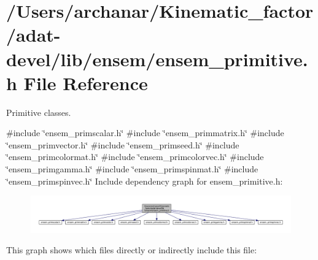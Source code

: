 \hypertarget{adat-devel_2lib_2ensem_2ensem__primitive_8h}{}\section{/\+Users/archanar/\+Kinematic\+\_\+factor/adat-\/devel/lib/ensem/ensem\+\_\+primitive.h File Reference}
\label{adat-devel_2lib_2ensem_2ensem__primitive_8h}


Primitive classes.  


{\ttfamily \#include \char`\"{}ensem\+\_\+primscalar.\+h\char`\"{}}\newline
{\ttfamily \#include \char`\"{}ensem\+\_\+primmatrix.\+h\char`\"{}}\newline
{\ttfamily \#include \char`\"{}ensem\+\_\+primvector.\+h\char`\"{}}\newline
{\ttfamily \#include \char`\"{}ensem\+\_\+primseed.\+h\char`\"{}}\newline
{\ttfamily \#include \char`\"{}ensem\+\_\+primcolormat.\+h\char`\"{}}\newline
{\ttfamily \#include \char`\"{}ensem\+\_\+primcolorvec.\+h\char`\"{}}\newline
{\ttfamily \#include \char`\"{}ensem\+\_\+primgamma.\+h\char`\"{}}\newline
{\ttfamily \#include \char`\"{}ensem\+\_\+primspinmat.\+h\char`\"{}}\newline
{\ttfamily \#include \char`\"{}ensem\+\_\+primspinvec.\+h\char`\"{}}\newline
Include dependency graph for ensem\+\_\+primitive.\+h\+:
\nopagebreak
\begin{figure}[H]
\begin{center}
\leavevmode
\includegraphics[width=350pt]{dd/d68/adat-devel_2lib_2ensem_2ensem__primitive_8h__incl}
\end{center}
\end{figure}
This graph shows which files directly or indirectly include this file\+:
\nopagebreak
